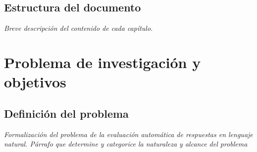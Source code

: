 \section{Estructura del documento}
\textit{Breve descripción del contenido de cada capítulo.}

\chapter{Problema de investigación y objetivos}

\section{Definición del problema}
\textit{Formalización del problema de la evaluación automática de respuestas en lenguaje natural. Párrafo que determine y categorice la naturaleza y alcance del problema}

